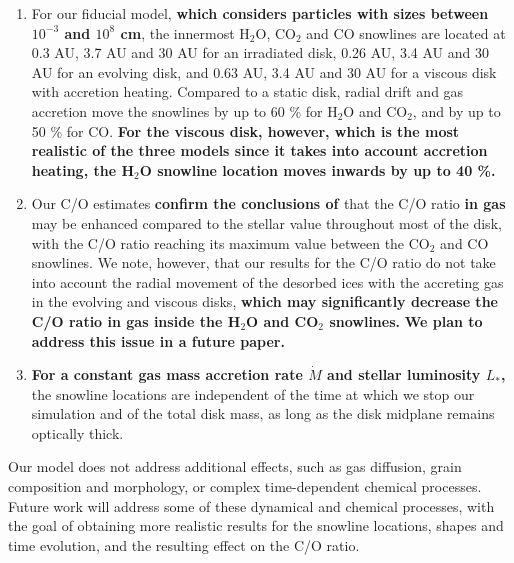 \documentclass[apj]{emulateapj}
\begin{document}
\begin{enumerate}
\item For our fiducial model, \textbf{which considers particles with sizes between $10^{-3}$ and $10^8$ cm}, the innermost H$_2$O, CO$_2$ and CO snowlines are located at 0.3 AU, 3.7 AU and 30 AU for an irradiated disk, 0.26 AU, 3.4 AU and 30 AU for an evolving disk, and 0.63 AU, 3.4 AU and 30 AU for a viscous disk with accretion heating. Compared to a static disk, radial drift and gas accretion move the snowlines by up to 60 \% for H$_2$O and CO$_2$, and by up to 50 \% for CO. \textbf{For the viscous disk, however, which is the most realistic of the three models since it takes into account accretion heating, the H$_2$O snowline location moves inwards by up to 40 \%.}

\item Our C/O estimates \textbf{confirm the conclusions of \citet{oberg11}} that the C/O ratio \textbf{in gas} may be enhanced compared to the stellar value throughout most of the disk, with the C/O ratio reaching its maximum value between the CO$_2$ and CO snowlines. %
We note, however, that our results for the C/O ratio do not take into account the radial movement of the desorbed ices with the accreting gas in the evolving and viscous disks, \textbf{which may significantly decrease the C/O ratio in gas inside the H$_2$O and CO$_2$ snowlines.} \textbf{We plan to address this issue in a future paper.}

\item \textbf{For a constant gas mass accretion rate $\dot{M}$ and stellar luminosity $L_*$,} the snowline locations are independent of the time at which we stop our simulation and of the total disk mass, as long as the disk midplane remains optically thick. %

\end{enumerate}

Our model does not address additional effects, such as gas diffusion, grain composition and morphology, or complex time-dependent chemical processes. Future work will address some of these dynamical and chemical processes, with the goal of obtaining more realistic results for the snowline locations, shapes and time evolution, and the resulting effect on the C/O ratio. %

\appendix
\end{document}
